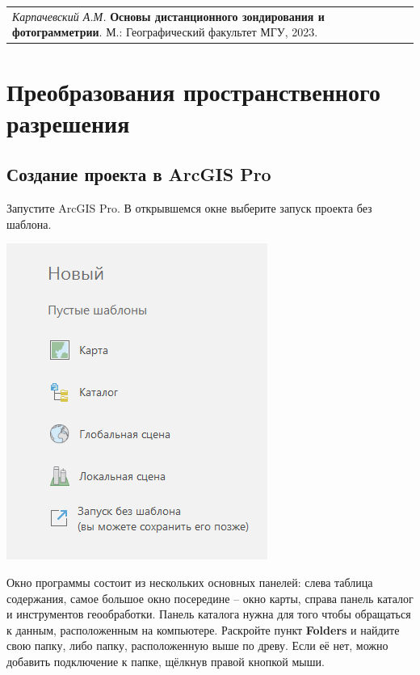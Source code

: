 \documentclass[
  12pt,
]{book}
\begin{document}
\begin{longtable}[]{@{}l@{}}
\toprule\noalign{}
\endhead
\bottomrule\noalign{}
\endlastfoot
\emph{Карпачевский А.М.} \textbf{Основы дистанционного зондирования и фотограмметрии}. М.: Географический факультет МГУ, 2023. \\
\end{longtable}

\hypertarget{pansharpen}{%
\chapter{Преобразования пространственного разрешения}\label{pansharpen}}

\hypertarget{pansharpen-project}{%
\section{Создание проекта в ArcGIS Pro}\label{pansharpen-project}}

Запустите ArcGIS Pro. В открывшемся окне выберите запуск проекта без шаблона.

\includegraphics{images/Ref01/Launching.png}

Окно программы состоит из нескольких основных панелей: слева таблица содержания, самое большое окно посередине -- окно карты, справа панель каталог и инструментов геообработки. Панель каталога нужна для того чтобы обращаться к данным, расположенным на компьютере. Раскройте пункт \textbf{Folders} и найдите свою папку, либо папку, расположенную выше по древу. Если её нет, можно добавить подключение к папке, щёлкнув правой кнопкой мыши.
\end{document}
